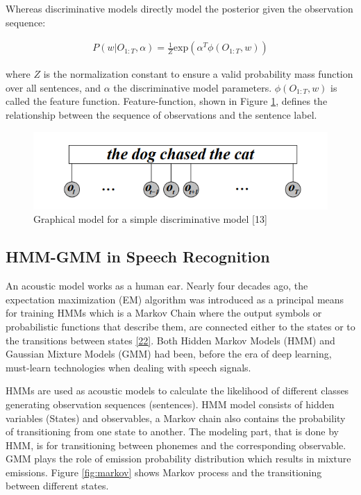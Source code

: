 \documentclass[
  a4paper,
]{article}
\begin{document}
Whereas discriminative models directly model the posterior given the
observation sequence:

\begin{align}
P(w|O_{1:T}, \alpha) = \frac{1}{Z} \mathrm{exp} (\alpha^T \phi(O_{1:T}, w))
\end{align}

where \(Z\) is the normalization constant to ensure a valid probability
mass function over all sentences, and \(\alpha\) the discriminative
model parameters. \(\phi(O_{1:T}, w)\) is called the feature function.
Feature-function, shown in Figure \ref{fig:discriminative}, defines the
relationship between the sequence of observations and the sentence
label.

\begin{figure}

{\centering \includegraphics{discriminative} 

}

\caption{Graphical model for a simple discriminative model [13]}\label{fig:discriminative}
\end{figure}

\hypertarget{hmm-gmm-in-speech-recognition}{%
\subsection{HMM-GMM in Speech
Recognition}\label{hmm-gmm-in-speech-recognition}}

An acoustic model works as a human ear. Nearly four decades ago, the
expectation maximization (EM) algorithm was introduced as a principal
means for training HMMs which is a Markov Chain where the output symbols
or probabilistic functions that describe them, are connected either to
the states or to the transitions between states
\protect\hyperlink{ref-4815544}{{[}22{]}}. Both Hidden Markov Models
(HMM) and Gaussian Mixture Models (GMM) had been, before the era of deep
learning, must-learn technologies when dealing with speech signals.

HMMs are used as acoustic models to calculate the likelihood of
different classes generating observation sequences (sentences). HMM
model consists of hidden variables (States) and observables, a Markov
chain also contains the probability of transitioning from one state to
another. The modeling part, that is done by HMM, is for transitioning
between phonemes and the corresponding observable. GMM plays the role of
emission probability distribution which results in mixture emissions.
Figure \ref{fig:markov} shows Markov process and the transitioning
between different states.
\end{document}
